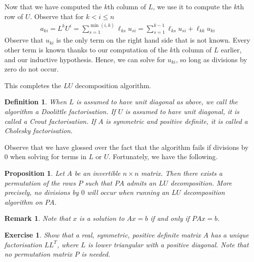 \documentclass[12pt,reqno]{amsart}
\numberwithin{equation}{section}  %
\newtheorem{proposition}[theorem]{Proposition}
\newtheorem{definition}[theorem]{Definition}
\newtheorem{remark}[theorem]{Remark}
\newtheorem{exercise}{Exercise}
\begin{document}
Now that we have computed the $k$th column of $L$, we use it
to compute the $k$th row of $U$. Observe that for $k < i \le n$
\begin{align*}
a_{ki} = L^k U^i = \sum_{s=1}^{\min(i,k)}\ell_{ks}u_{si}
= \sum_{s=1}^{k-1} \ell_{ks} u_{si} + \ell_{kk} u_{ki}
\end{align*}
Observe that $u_{ki}$ is the only term on the right hand side
that is not known. Every other term is known thanks to our computation
of the $k$th column of $L$ earlier, and our inductive hypothesis. Hence,
we can solve for $u_{ki}$, so long as divisions by zero do not occur.

This completes the $LU$ decomposition algorithm. 

\begin{definition}
When $L$ is assumed to have unit diagonal
as above, we call the algorithm a \emph{Doolittle factorisation}. 
If $U$ is assumed to have unit diagonal, it is called a \emph{Crout
factorisation}. If $A$ is symmetric and positive definite, it is called a
\emph{Cholesky factorisation}.
\end{definition}
Observe that we have glossed over the fact that the algorithm fails
if divisions by $0$ when solving for terms in $L$ or $U$. Fortunately,
we have the following.
\begin{proposition}
Let $A$ be an invertible $n \times n$ matrix. Then there exists
a permutation of the rows $P$ such that $PA$ admits 
an $LU$ decomposition. More precisely, no divisions by $0$ will
occur when running an $LU$ decomposition algorithm on $PA$.
\end{proposition}
\begin{remark}
Note that $x$ is a solution to $Ax = b$ if and only if $PAx = b$.
\end{remark}
\begin{exercise}
Show that a real, symmetric, positive definite matrix $A$ has a unique
factorisation $L L^T$, where $L$ is lower triangular
with a positive diagonal. Note that no permutation matrix $P$ is needed.
\end{exercise}
\end{document}
